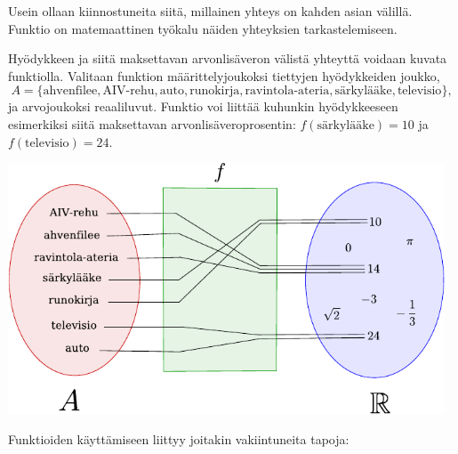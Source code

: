 Usein ollaan kiinnostuneita siitä, millainen yhteys on kahden asian välillä.
Funktio on matemaattinen työkalu näiden yhteyksien tarkastelemiseen.



\begin{esimerkki}
	Hyödykkeen ja siitä maksettavan arvonlisäveron välistä yhteyttä voidaan kuvata funktiolla.
	Valitaan funktion määrittelyjoukoksi tiettyjen hyödykkeiden joukko,
		\[ A = \{\text{ahvenfilee}, \text{AIV-rehu}, \text{auto}, \text{runokirja},
		\text{ravintola-ateria}, \text{särkylääke}, \text{televisio}\}, \]
	ja arvojoukoksi reaaliluvut.
	Funktio voi liittää kuhunkin hyödykkeeseen esimerkiksi siitä maksettavan arvonlisäveroprosentin:
	$f(\text{särkylääke}) = 10$ ja $f(\text{televisio}) = 24$.
	
	\begin{center}
		\includegraphics[width=13cm]{pictures/funktiokone.pdf}
	\end{center}
\end{esimerkki}

Funktioiden käyttämiseen liittyy joitakin vakiintuneita tapoja:
\begin{alakohdat}
\end{alakohdat}

